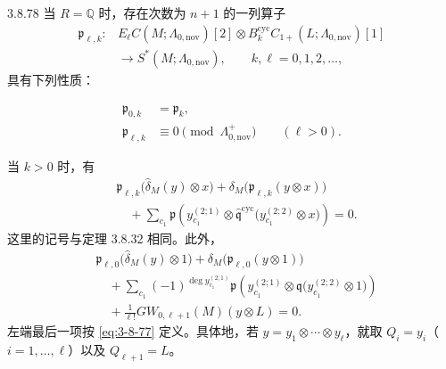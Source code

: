 \begin{proposition}{3.8.78}\label{prop:3-8-78}
当 $R=\mathbb Q$ 时，存在次数为 $n+1$ 的一列算子
\[
\begin{aligned}
 \mathfrak p_{\ell,k}\colon{}&
 E_\ell C(M;\Lambda_{0,\mathrm{nov}})[2]
 \otimes
 B_k^{\mathrm{cyc}}C_{1+}(L;\Lambda_{0,\mathrm{nov}})[1]\\
 &\longrightarrow S^*(M;\Lambda_{0,\mathrm{nov}}),
 \qquad k,\ell=0,1,2,\ldots,
\end{aligned}
\]
具有下列性质：

\begin{align}
 \mathfrak p_{0,k}&=\mathfrak p_k,
 \tag{3.8.79.1}\label{eq:3-8-79-1}\\
 \mathfrak p_{\ell,k}&\equiv0
 \pmod{\Lambda^+_{0,\mathrm{nov}}}
 \qquad(\ell>0).
 \tag{3.8.79.2}\label{eq:3-8-79-2}
\end{align}

当 $k>0$ 时，有
\begin{equation}
\begin{aligned}
 &\mathfrak p_{\ell,k}
 \bigl(\widehat\delta_M(y)\otimes x\bigr)
 +\delta_M\bigl(\mathfrak p_{\ell,k}(y\otimes x)\bigr)\\
 &\quad+
 \sum_{c_1}
 \mathfrak p\left(
 y_{c_1}^{(2;1)}\otimes
 \widehat{\mathfrak q}^{\mathrm{cyc}}
 \bigl(y_{c_1}^{(2;2)}\otimes x\bigr)
 \right)=0.
\end{aligned}
\tag{3.8.79.3}\label{eq:3-8-79-3}
\end{equation}
这里的记号与定理 3.8.32 相同。此外，
\begin{equation}
\begin{aligned}
 &\mathfrak p_{\ell,0}
 \bigl(\widehat\delta_M(y)\otimes1\bigr)
 +\delta_M\bigl(\mathfrak p_{\ell,0}(y\otimes1)\bigr)\\
 &\quad+
 \sum_{c_1}
 (-1)^{\deg y_{c_1}^{(2;1)}}
 \mathfrak p\left(
 y_{c_1}^{(2;1)}\otimes
 \mathfrak q\bigl(y_{c_1}^{(2;2)}\otimes1\bigr)
 \right)\\
 &\quad+
 \frac1{\ell!}GW_{0,\ell+1}(M)(y\otimes L)=0.
\end{aligned}
\tag{3.8.79.4}\label{eq:3-8-79-4}
\end{equation}
左端最后一项按 \eqref{eq:3-8-77} 定义。具体地，若
$y=y_1\otimes\cdots\otimes y_\ell$，就取
$Q_i=y_i$（$i=1,\ldots,\ell$）以及 $Q_{\ell+1}=L$。


\end{proposition}

